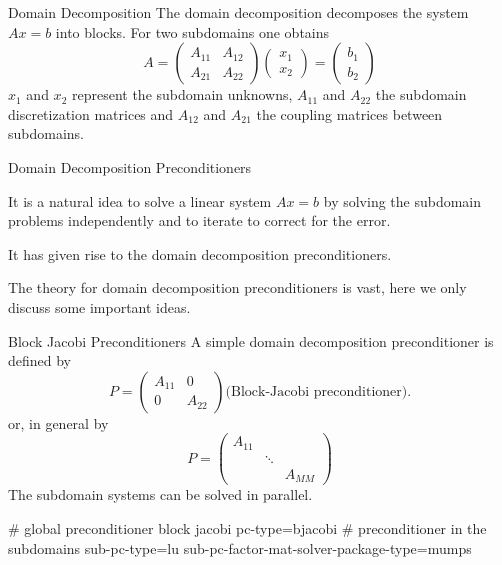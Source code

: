 \begin{frame}{Domain Decomposition}
  The domain decomposition decomposes the system $Ax = b$ into
  blocks. For two subdomains one obtains
  \begin{equation*}
A =
\begin{pmatrix}
  A_{11} & A_{12}\\
  A_{21} & A_{22}
\end{pmatrix}
\begin{pmatrix}
  x_1\\
  x_2
\end{pmatrix}
=
\begin{pmatrix}
  b_1\\
  b_2
\end{pmatrix}
\end{equation*}
$x_1$ and $x_2$ represent the subdomain unknowns, $A_{11}$ and $A_{22}$ the
subdomain discretization matrices and $A_{12}$ and $A_{21}$ the coupling
matrices between subdomains.
\end{frame}

\begin{frame}{Domain Decomposition Preconditioners}

It is a natural idea to solve a linear system $Ax = b$ by solving the
subdomain problems independently and to iterate to correct for
the error.

It has given rise to the domain decomposition
preconditioners.

The theory for domain decomposition preconditioners is vast,
here we only discuss some important ideas.

\end{frame}

\begin{frame}[fragile]{Block Jacobi Preconditioners}
  A simple domain decomposition preconditioner is defined by
  \begin{equation*}
    P=
    \begin{pmatrix}
      A_{11}&0\\
      0 & A_{22}
    \end{pmatrix}\mbox{(Block-Jacobi preconditioner).}
  \end{equation*}
  or, in general by
  \begin{equation*}
    P=
    \begin{pmatrix}
      A_{11}&&\\
      &\ddots&\\
      &&A_{MM}
    \end{pmatrix}

  \end{equation*}
  The subdomain systems can be solved in parallel.

  \begin{bashcode}
    # global preconditioner block jacobi
    pc-type=bjacobi
    # preconditioner in the subdomains
    sub-pc-type=lu
    sub-pc-factor-mat-solver-package-type=mumps
  \end{bashcode}
\end{frame}

